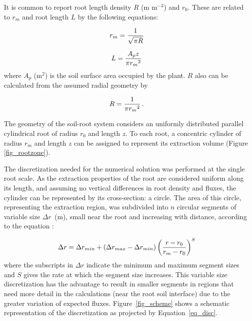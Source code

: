 It is common to report root length density $R$ (m m$^{-3}$) and $r_0$. These are related to $r_m$ and root length $L$ \uhead by the following equations:

\begin{equation}
\label{eq_rm}
r_m = {1 \over \sqrt{\pi R}}
\end{equation}

\begin{equation}
\label{eq_L}
L = {A_p z \over \pi {r_m}^2}
\end{equation}
%
where $A_p$ (m$^2$) is the soil surface area occupied by the plant. $R$ also can be calculated from the assumed radial geometry by

\begin{equation}
\label{eq_R}
R = {1 \over \pi {r_m}^2}\,.
\end{equation}

The geometry of the soil-root system considers an uniformly distributed parallel cylindrical root of radius $r_0$ and length $z$. 
To each root, a concentric cylinder of radius $r_m$ and length $z$ can be assigned to represent its extraction volume (Figure \ref{fig_rootzone}).

The discretization needed for the numerical solution was performed at the single root scale. 
As the extraction properties of the root are considered uniform along its length, and assuming no vertical differences in root density and fluxes, the cylinder can be represented by its cross-section: a circle. 
The area of this circle, representing the extraction region, was subdivided into $n$ circular segments of variable size $\Delta r$~(m), small near the root and increasing with distance, according to the equation \cite{liersolute}:

\begin{equation}
\label{eq_disc}
\Delta r = \Delta r_{min}+(\Delta r_{max}-\Delta r_{min}) \left( {r-r_0 \over r_m-r_0} \right)^S
\end{equation}
%
where the subscripts 
in $\Delta r$ 
indicate the minimum and maximum segment sizes and $S$ gives the rate at which the segment size increases. 
This variable size discretization has the advantage to result in smaller segments in regions that need more detail in the calculations (near the root soil interface) due to the greater variation of expected fluxes. 
Figure~\ref{fig_scheme} shows a schematic representation of the discretization as projected by Equation~\ref{eq_disc}.

